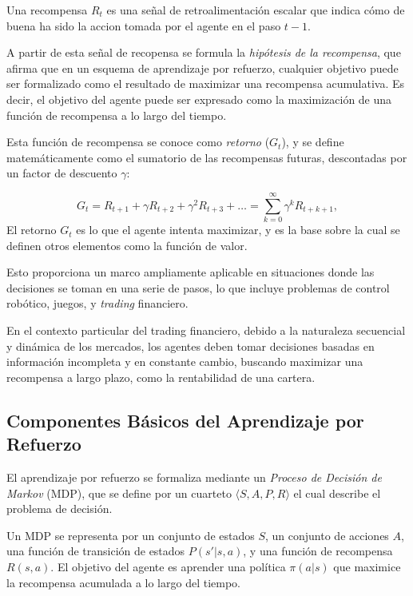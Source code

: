 \documentclass[a4paper,12pt, twoside]{report}
\begin{document}
Una recompensa \(R_t\) es una señal de retroalimentación escalar que indica cómo de buena ha sido la accion 
tomada por el agente en el paso \(t-1\). 

A partir de esta señal de recopensa se formula
la \textit{hipótesis de la recompensa}, que afirma que en un esquema de aprendizaje por refuerzo, cualquier 
objetivo puede ser formalizado como el resultado de maximizar una recompensa acumulativa. Es decir, el objetivo del agente puede ser expresado como la maximización de una función de recompensa a lo 
largo del tiempo.

Esta función de recompensa se conoce como \textit{retorno} (\(G_t\)), y se define matemáticamente como el sumatorio
de las recompensas futuras, descontadas por un factor de descuento  \(\gamma\):

\begin{equation}
G_t = R_{t+1} + \gamma R_{t+2} + \gamma^2 R_{t+3} + \dots = \sum_{k=0}^{\infty} \gamma^k R_{t+k+1},
\end{equation}
El retorno \(G_t\) es lo que el agente intenta maximizar, y es la base sobre la cual se definen otros elementos como la función de valor.


Esto proporciona un marco ampliamente aplicable en situaciones donde 
las decisiones se toman en una serie de pasos, lo que incluye problemas de control robótico, juegos, 
y \textit{trading} financiero.

En el contexto particular del trading financiero, debido a la naturaleza secuencial y dinámica de 
los mercados, los agentes deben tomar decisiones basadas en información incompleta y en constante 
cambio, buscando maximizar una recompensa a largo plazo, como la rentabilidad de una cartera.


\subsection{Componentes Básicos del Aprendizaje por Refuerzo}

El aprendizaje por refuerzo se formaliza mediante un \textit{Proceso de Decisión de Markov} (MDP), 
que se define por un cuarteto \(\langle S, A, P, R \rangle\) el cual describe el problema de decisión.

Un MDP se representa por un conjunto de estados \(S\), 
un conjunto de acciones \(A\), una función de transición de estados \(P(s'|s, a)\), y una función de 
recompensa \(R(s, a)\). El objetivo del agente es aprender una política \(\pi(a|s)\) que maximice la 
recompensa acumulada a lo largo del tiempo.
\end{document}
